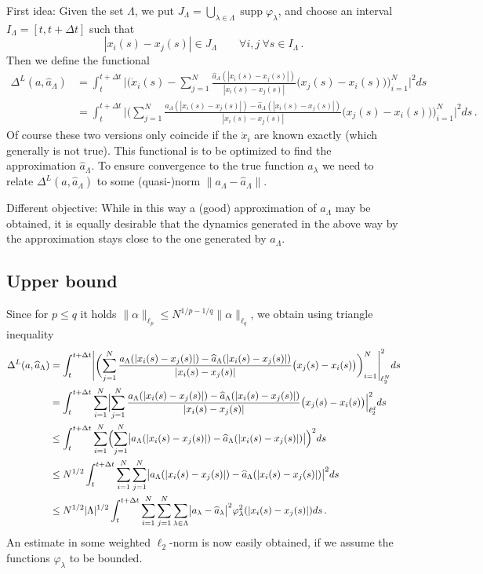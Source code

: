 \documentclass[A4paper,11pt]{article}
\theoremstyle{definition}
\DeclareMathOperator{\supp}{supp}
\begin{document}
First idea: Given the set $\Lambda$, we put $J_\Lambda=\bigcup_{\lambda\in\Lambda}\supp\varphi_\lambda$, and choose an interval $I_\Lambda=[t,t+\Delta t]$ such that
\[
	|x_i(s)-x_j(s)|\in J_\Lambda\qquad\forall i,j\ \forall s\in I_\Lambda\,.
\]
Then we define the functional
\begin{align*}
	\Delta^L(a,\widehat a_\Lambda)
		&=\int_t^{t+\Delta t}
			\Biggl|\biggl(\dot x_i(s)-\sum_{j=1}^N\frac{\widehat a_\Lambda(|x_i(s)-x_j(s)|)}{|x_i(s)-x_j(s)|}
				\bigl(x_j(s)-x_i(s)\bigr)\biggr)_{i=1}^N\Biggr|^2 ds\\
		&=\int_t^{t+\Delta t}\Biggl|\biggl(\sum_{j=1}^N
			\frac{a_\Lambda(|x_i(s)-x_j(s)|)-\widehat a_\Lambda(|x_i(s)-x_j(s)|)}{|x_i(s)-x_j(s)|}
			\bigl(x_j(s)-x_i(s)\bigr)\biggr)_{i=1}^N\Biggr|^2 ds\,.
\end{align*}
Of course these two versions only coincide if the $\dot x_i$ are known exactly (which generally is not true). This functional is to be optimized to find the approximation $\widehat a_\Lambda$. To ensure convergence to the true function $a_\lambda$ we need to relate $\Delta^L(a,\widehat a_\Lambda)$ to some (quasi-)norm $\|a_\Lambda-\widehat a_\Lambda\|$.

Different objective: While in this way a (good) approximation of $a_\Lambda$ may be obtained, it is equally desirable that the dynamics generated in the above way by the approximation stays close to the one generated by $a_\Lambda$.

\subsection{Upper bound}

Since for $p\leq q$ it holds $\|\alpha\|_{\ell_p}\leq N^{1/p-1/q}\|\alpha\|_{\ell_q}$, we obtain using triangle inequality
\begin{align*}
	\Delta^L(a,\widehat a_\Lambda)
		&=\int_t^{t+\Delta t}\Biggl|\biggl(\sum_{j=1}^N
			\frac{a_\Lambda(|x_i(s)-x_j(s)|)-\widehat a_\Lambda(|x_i(s)-x_j(s)|)}{|x_i(s)-x_j(s)|}
			\bigl(x_j(s)-x_i(s)\bigr)\biggr)_{i=1}^N\Biggr|_{\ell_2^N}^2 ds\\
		&=\int_t^{t+\Delta t}\sum_{i=1}^N\Bigl|\sum_{j=1}^N
			\frac{a_\Lambda(|x_i(s)-x_j(s)|)-\widehat a_\Lambda(|x_i(s)-x_j(s)|)}{|x_i(s)-x_j(s)|}
			\bigl(x_j(s)-x_i(s)\bigr)\Bigr|_{\ell_2^d}^2 ds\\
		&\leq\int_t^{t+\Delta t}\sum_{i=1}^N\Bigl(\sum_{j=1}^N
			\bigl|a_\Lambda(|x_i(s)-x_j(s)|)-\widehat a_\Lambda(|x_i(s)-x_j(s)|)\bigr|\Bigr)^2 ds\\
		&\leq N^{1/2}\int_t^{t+\Delta t}\sum_{i=1}^N\sum_{j=1}^N
			\bigl|a_\Lambda(|x_i(s)-x_j(s)|)-\widehat a_\Lambda(|x_i(s)-x_j(s)|)\bigr|^2 ds\\
		&\leq N^{1/2}|\Lambda|^{1/2}\int_t^{t+\Delta t}\sum_{i=1}^N\sum_{j=1}^N\sum_{\lambda\in\Lambda}
			\bigl|a_\lambda-\widehat a_\lambda\bigr|^2\varphi^2_\lambda(|x_i(s)-x_j(s)|) ds\,.
\end{align*}
An estimate in some weighted $\ell_2$-norm is now easily obtained, if we assume the functions $\varphi_\lambda$ to be bounded.
\end{document}
